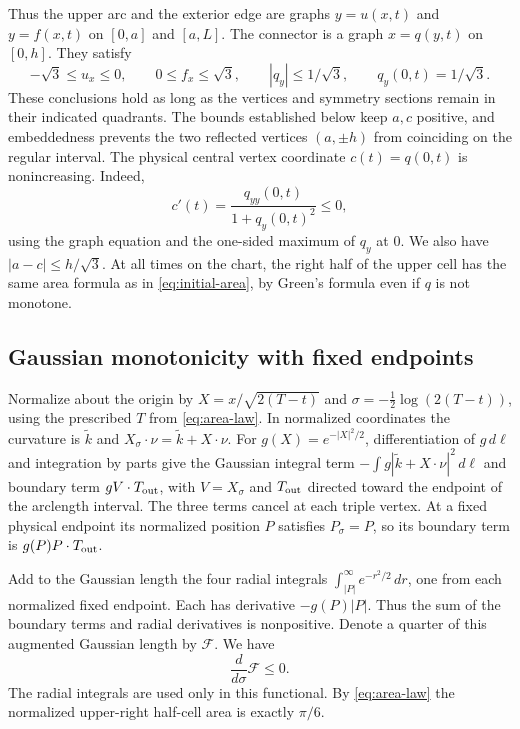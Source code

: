 Thus the upper arc and the exterior edge are graphs \(y=u(x,t)\)
and \(y=f(x,t)\) on \([0,a]\) and \([a,L]\). The connector is a graph
\(x=q(y,t)\) on \([0,h]\). They satisfy
\begin{equation}
 -\sqrt3\le u_x\le0,\qquad 0\le f_x\le\sqrt3,\qquad
 |q_y|\le1/\sqrt3,\qquad q_y(0,t)=1/\sqrt3 .
 \label{eq:slopes}
\end{equation}
These conclusions hold as long as the vertices and symmetry
sections remain in their indicated quadrants. The bounds established
below keep \(a,c\) positive, and embeddedness prevents the two
reflected vertices \((a,\pm h)\) from coinciding on the regular
interval. The physical central vertex coordinate \(c(t)=q(0,t)\)
is nonincreasing. Indeed,
\begin{equation}
 c'(t)=\frac{q_{yy}(0,t)}{1+q_y(0,t)^2}\le0,
 \label{eq:c}
\end{equation}
using the graph equation and the one-sided maximum of \(q_y\) at \(0\).
We also have \(|a-c|\le h/\sqrt3\). At all times on the chart, the
right half of the upper cell has the same area formula as in
\eqref{eq:initial-area}, by Green's formula even if \(q\) is not
monotone.

\subsection{Gaussian monotonicity with fixed endpoints}

Normalize about the origin by \(X=x/\sqrt{2(T-t)}\) and
\(\sigma=-\frac12\log(2(T-t))\), using the prescribed \(T\) from
\eqref{eq:area-law}. In normalized coordinates the curvature is
\(\widetilde k\) and \(X_\sigma\cdot\nu=\widetilde k+X\cdot\nu\).
For \(g(X)=e^{-|X|^2/2}\), differentiation of \(g\,d\ell\) and
integration by parts give the Gaussian integral term
\(-\int g|\widetilde k+X\cdot\nu|^2\,d\ell\) and boundary term
\(g V\cdot T_{\rm out}\), with \(V=X_\sigma\) and \(T_{\rm out}\)
directed toward the endpoint of the arclength interval. The three
terms cancel at each triple vertex. At a fixed physical endpoint
its normalized position \(P\) satisfies \(P_\sigma=P\), so its
boundary term is \(g(P)P\cdot T_{\rm out}\).

Add to the Gaussian length the four radial integrals
\(\int_{|P|}^\infty e^{-r^2/2}\,dr\), one from each normalized fixed
endpoint. Each has derivative \(-g(P)|P|\). Thus the sum of the
boundary terms and radial derivatives is nonpositive. Denote a quarter
of this augmented Gaussian length by \(\mathcal F\). We have
\begin{equation}
 \frac{d}{d\sigma}\mathcal F\le0.
 \label{eq:monotone}
\end{equation}
The radial integrals are used only in this functional.
By \eqref{eq:area-law} the normalized upper-right half-cell area is
exactly \(\pi/6\).

